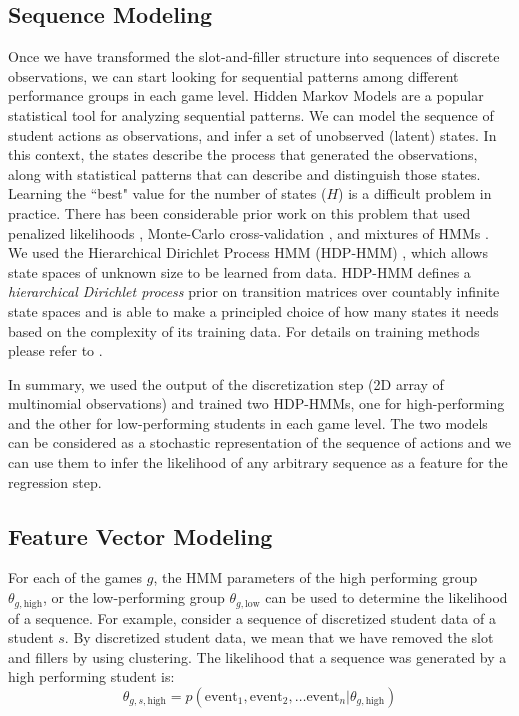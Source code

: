 \documentclass{sigchi}
\begin{document}
	\subsection{Sequence Modeling}
	Once we have transformed the slot-and-filler structure into sequences of discrete observations, we can start looking for sequential patterns among different performance groups in each game level.
	Hidden Markov Models are a popular statistical tool for analyzing sequential patterns.
	We can model the sequence of student actions as observations,
	and infer a set of unobserved (latent) states.
	In this context, the states describe the process that generated the observations, along with statistical patterns that can describe and distinguish those states.
	Learning the ``best" value for the number of states ($H$) is a difficult problem in practice. 
	There has been considerable prior work on this problem that used penalized likelihoods \cite{rabiner1989hmm}, Monte-Carlo cross-validation \cite{smyth1996clustering}, and mixtures of HMMs \cite{smyth1997clustering}.
	We used the Hierarchical Dirichlet Process HMM (HDP-HMM) \cite{fox2008hdp}, which allows state spaces of unknown size to be learned from data. 
	HDP-HMM defines a \textit{hierarchical Dirichlet process} prior on transition matrices over countably infinite state spaces and is able to make a principled choice of how many states it needs based on the complexity of its training data. 
	For details on training methods please refer to \cite{fox2008hdp}.
	
	In summary, we used the output of the discretization step (2D array of multinomial observations) and trained two HDP-HMMs, one for high-performing and the other for low-performing students in each game level. 
	The two models can be considered as a stochastic representation of the sequence of actions and we can use them to infer the likelihood of any arbitrary sequence as a feature for the regression step. 
	
	\subsection{Feature Vector Modeling}


	For each of the games $g$, the HMM parameters  of the high performing group $\theta_{g,\text{high}}$, or the low-performing group  $\theta_{g,\text{low}}$ can be used to determine the likelihood of a sequence.
	For example,	consider a sequence of discretized student data of a student $s$.
	By discretized student data, we mean that we have removed the slot and fillers by using clustering.
	The likelihood that  a sequence was generated by a high performing student is:
	\begin{equation}
	 \theta_{g, s, \text{high}} =  p( \text{event}_1,\text{event}_2, \dots \text{event}_n | \theta_{g,\text{high}} ) 
	\end{equation}
	
\end{document}
